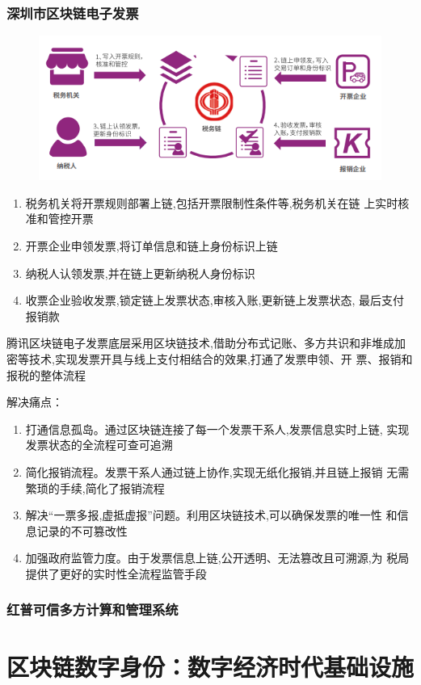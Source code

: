\documentclass[11pt]{beamer}
\begin{document}
\begin{frame}[allowframebreaks]
	\frametitle{深圳市区块链电子发票}
	\begin{figure}
		\centering
		\includegraphics[width=0.6\linewidth]{figures/gov/8}
		\label{fig:8}
	\end{figure}
	{\footnotesize 	\begin{enumerate}
		\item 税务机关将开票规则部署上链,包括开票限制性条件等,税务机关在链
		      上实时核准和管控开票
		\item 开票企业申领发票,将订单信息和链上身份标识上链
		\item 纳税人认领发票,并在链上更新纳税人身份标识
		\item 收票企业验收发票,锁定链上发票状态,审核入账,更新链上发票状态,
		      最后支付报销款
	\end{enumerate}}
	{\footnotesize 	腾讯区块链电子发票底层采用区块链技术,借助分布式记账、多方共识和非堆成加密等技术,实现发票开具与线上支付相结合的效果,打通了发票申领、开
	票、报销和报税的整体流程}

	解决痛点：
	\begin{enumerate}
		\item 打通信息孤岛。通过区块链连接了每一个发票干系人,发票信息实时上链,
		      实现发票状态的全流程可查可追溯
		\item 简化报销流程。发票干系人通过链上协作,实现无纸化报销,并且链上报销
		      无需繁琐的手续,简化了报销流程
		\item 解决“一票多报,虚抵虚报”问题。利用区块链技术,可以确保发票的唯一性
		      和信息记录的不可篡改性
		\item 加强政府监管力度。由于发票信息上链,公开透明、无法篡改且可溯源,为
		      税局提供了更好的实时性全流程监管手段
	\end{enumerate}
\end{frame}

\begin{frame}
	\frametitle{红普可信多方计算和管理系统}
\end{frame}

\section{区块链数字身份：数字经济时代基础设施}
\end{document}
